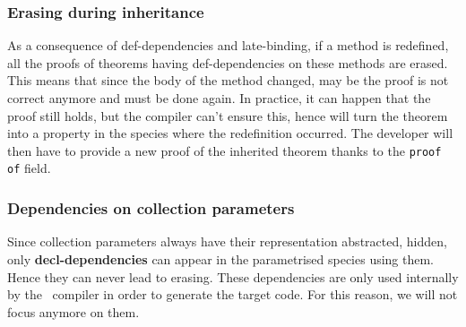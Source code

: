 \subsubsection{Erasing during inheritance}
\label{erasing}
As a consequence of def-dependencies and late-binding, if a method is
redefined, all the proofs of theorems having def-dependencies on these
methods are erased. This means that since the body of the method
changed, may be the proof is not correct anymore and must be done
again. In practice, it can happen that the proof still holds, but the
compiler can't ensure this, hence will turn the theorem into a property
in the species where the redefinition occurred. The developer will
then have to provide a new proof of the inherited theorem thanks to the
{\tt proof of} field.



\subsubsection{Dependencies on collection parameters}
Since collection parameters always have their representation abstracted,
hidden, only {\bf decl-dependencies} can appear in the parametrised
species using them. Hence they can never lead to erasing. These
dependencies are only used internally by the \focal\ compiler in order
to generate the target code. For this reason, we will not focus anymore
on them.
